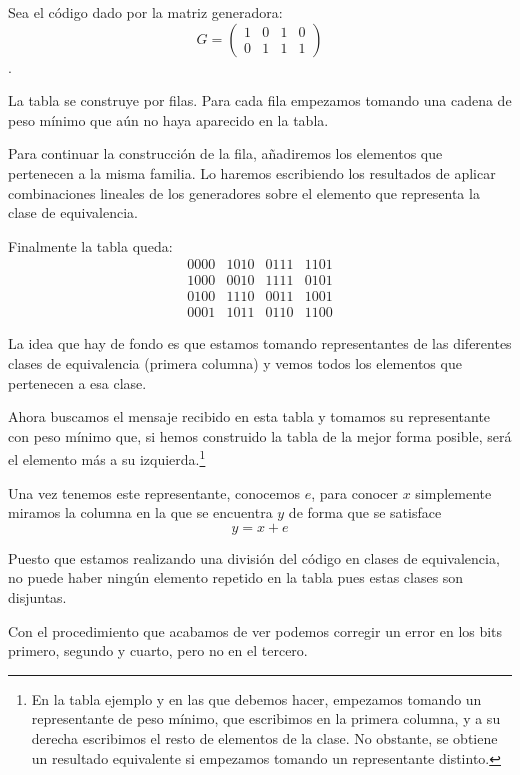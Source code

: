 \begin{example}
Sea el código dado por la matriz generadora:
\[G = \left( \begin{array}{cccc} 1 & 0 & 1 & 0 \\ 0 & 1 & 1 & 1 \end{array}\right)\].

La tabla se construye por filas. Para cada fila empezamos tomando una cadena de peso mínimo que aún no haya aparecido en la tabla.

Para continuar la construcción de la fila, añadiremos los elementos que pertenecen a la misma familia. Lo haremos escribiendo los resultados de aplicar combinaciones lineales de los generadores sobre el elemento que representa la clase de equivalencia.

Finalmente la tabla queda:
\[\begin{array}{cccc}
0000 & 1010 & 0111 & 1101 \\
1000 & 0010 & 1111 & 0101 \\
0100 & 1110 & 0011 & 1001 \\
0001 & 1011 & 0110 & 1100
\end{array}\]

La idea que hay de fondo es que estamos tomando representantes de las diferentes clases de equivalencia (primera columna) y vemos todos los elementos que pertenecen a esa clase.

Ahora buscamos el mensaje recibido en esta tabla y tomamos su representante con peso mínimo que, si hemos construido la tabla de la mejor forma posible, será el elemento más a su izquierda.\footnote{En la tabla ejemplo y en las que debemos hacer, empezamos tomando un representante de peso mínimo, que escribimos en la primera columna, y a su derecha escribimos el resto de elementos de la clase. No obstante, se obtiene un resultado equivalente si empezamos tomando un representante distinto.}

Una vez tenemos este representante, conocemos $e$, para conocer $x$ simplemente miramos la columna en la que se encuentra $y$ de forma que se satisface
\[y=x+e\]

\obs Puesto que estamos realizando una división del código en clases de equivalencia, no puede haber ningún elemento repetido en la tabla pues estas clases son disjuntas.
\end{example}

Con el procedimiento que acabamos de ver podemos corregir un error en los bits primero, segundo y cuarto, pero no en el tercero.

